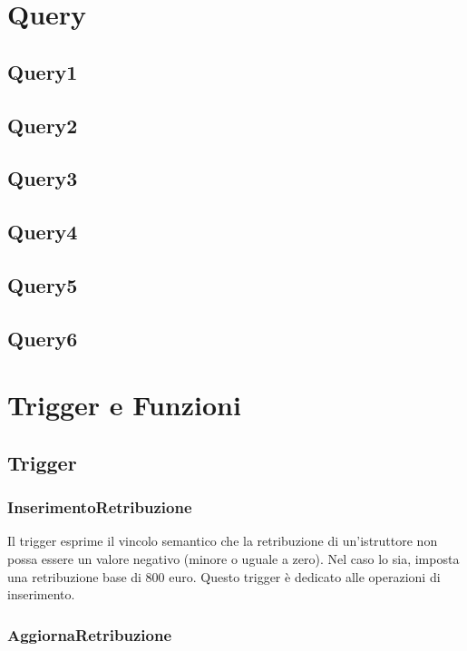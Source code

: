 \chapter{Query} 

\section{Query1}

\section{Query2}

\section{Query3}

\section{Query4}

\section{Query5}

\section{Query6}

\chapter{Trigger e Funzioni} 

\section{Trigger}

\subsection{InserimentoRetribuzione}


Il trigger esprime il vincolo semantico che la retribuzione di un'istruttore non possa essere un valore negativo (minore o uguale a zero). Nel caso lo sia, imposta una retribuzione base di 800 euro.
Questo trigger è dedicato alle operazioni di inserimento.

\subsection{AggiornaRetribuzione}


